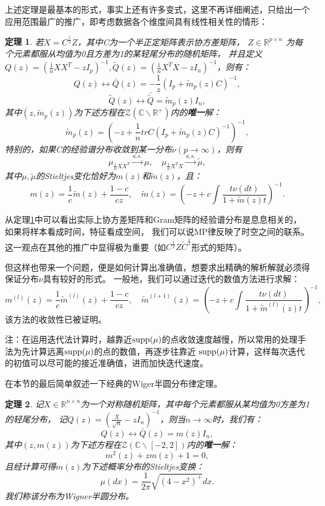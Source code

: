 \documentclass[UTF8,12pt]{ctexart}
\newtheorem{theorem}{定理}
\begin{document}
上述定理是最基本的形式，事实上还有许多变式，这里不再详细阐述，只给出一个应用范围最广的推广\cite{MP2}，即考虑数据各个维度间具有线性相关性的情形：

\begin{theorem}\label{MP2}
    若$X = C^{\frac{1}{2}}Z$，其中C为一个半正定矩阵表示协方差矩阵，
    $Z \in \mathbb R ^{p\times n}$ 为每个元素都服从均值为0且方差为1的某轻尾分布的随机矩阵，
    并且定义$Q(z)={(\frac{1}{n}XX^T-zI_p)}^{-1}, \tilde Q(z) = {(\frac{1}{n}X^T X-zI_n)}^{-1}$，则有：
    \[
        Q(z) \leftrightarrow \bar{Q}(z) = -\frac{1}{z}{(I_p + \tilde{m}_p(z)C)}^{-1}, 
    \]
    \[
        \tilde Q(z) \leftrightarrow \bar{\tilde{Q}} = \tilde{m}_p(z)I_n,
    \]  
    其中$(z,\tilde{m}_p(z))$为下述方程在$\mathcal Z (\mathbb C \backslash \mathbb R^+)$内的\textbf{唯一}解：
    \[
        \tilde{m}_p(z) = {(
            -z + \frac{1}{n}trC{(I_p + \tilde{m}_p(z)C)}^{-1}
        )}^{-1},
    \]  
    特别的，如果C的经验谱分布收敛到某一分布$\nu (p \rightarrow \infty)$，则有
    \[
        \mu_{\frac{1}{n}XX^T} \stackrel{a.s.}{\rightarrow} \mu,\quad \mu_{\frac{1}{n}X^T X} \stackrel{a.s.}{\rightarrow} \tilde \mu,
    \]
        其中$\mu,\tilde\mu$的Stieltjes变化恰好为$m(z)$和$\tilde m (z)$，且：
    \[
        m(z) = \frac{1}{c}\tilde m(z) + \frac{1-c}{cz},\quad
        \tilde m(z) = {(
            -z + c\int\frac{t \nu (dt)}{1+\tilde m (z)t}
        )}^{-1}.
    \]
\end{theorem}

从定理\ref{MP2}中可以看出实际上协方差矩阵和Gram矩阵的经验谱分布是息息相关的，如果将样本看成时间，特征看成空间，
我们可以说MP律反映了时空之间的联系。这一观点在其他的推广中显得极为重要（如$C^{\frac{1}{2}}Z\tilde{C}^{\frac{1}{2}}$形式的矩阵）。

但这样也带来一个问题，便是如何计算出准确值，想要求出精确的解析解就必须得保证分布$\nu$具有较好的形式。
一般地，我们可以通过迭代的数值方法进行求解\cite{numericalMP}：
\[
    m^{(l)}(z) = \frac{1}{c}\tilde m^{(l)}(z) + \frac{1-c}{cz},\quad
    \tilde m^{(l+1)}(z) = {(
        -z + c\int\frac{t \nu (dt)}{1+\tilde m^{(l)} (z)t}
    )}^{-1},
\]
该方法的收敛性已被证明。

注：在运用迭代法计算时，越靠近$\textup{supp}(\mu)$的点收敛速度越慢，所以常用的处理手法为先计算远离$\textup{supp}(\mu)$的点的数值，再逐步往靠近
$\textup{supp}(\mu)$计算，这样每次迭代的初值可以尽可能的接近准确值，进而加快迭代速度。

在本节的最后简单叙述一下经典的Wiger半圆分布律定理\cite{wigner}。

\begin{theorem}
    记$X \in \mathbb R^{n \times n}$为一个对称随机矩阵，其中每个元素都服从某均值为0方差为1的轻尾分布，
    记$Q(z) = {(
        \frac{X}{\sqrt{n}}-zI_n
    )}^{-1}$，则当$n \rightarrow \infty$时，我们有：
    \[
        Q(z) \leftrightarrow \bar Q(z) = m(z)I_n,  
    \]
    其中$(z,m(z))$为下述方程在$\mathcal Z (\mathbb C \backslash [-2,2])$内的\textbf{唯一}解：
    \[
        m^2(z) +zm(z) + 1 = 0,
    \]
    且经计算可得$m(z)$为下述概率分布的Stieltjes变换：
    \[
        \mu(dx) = \frac{1}{2\pi}\sqrt{
            {(4-x^2)}^+
        }dx.
    \] 
    我们称该分布为Wigner半圆分布。
\end{theorem}
\end{document}
